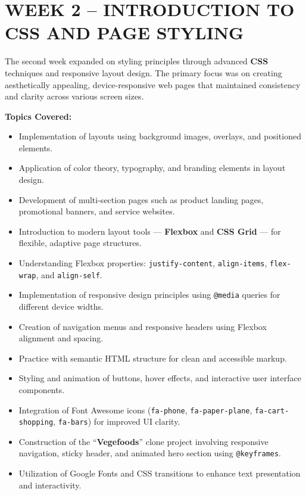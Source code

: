 \documentclass[a4paper,12pt,oneside]{report}
\numberwithin{equation}{chapter}
\numberwithin{figure}{chapter}
\numberwithin{table}{chapter}
\begin{document}
\vspace{5mm}
\noindent
\section{WEEK 2 – INTRODUCTION TO CSS AND PAGE STYLING}

The second week expanded on styling principles through advanced \textbf{CSS} techniques and responsive layout design. The primary focus was on creating aesthetically appealing, device-responsive web pages that maintained consistency and clarity across various screen sizes.

\textbf{Topics Covered:}
\begin{itemize}
    \item Implementation of layouts using background images, overlays, and positioned elements.
    \item Application of color theory, typography, and branding elements in layout design.
    \item Development of multi-section pages such as product landing pages, promotional banners, and service websites.
    \item Introduction to modern layout tools — \textbf{Flexbox} and \textbf{CSS Grid} — for flexible, adaptive page structures.
    \item Understanding Flexbox properties: \texttt{justify-content}, \texttt{align-items}, \texttt{flex-wrap}, and \texttt{align-self}.
    \item Implementation of responsive design principles using \texttt{@media} queries for different device widths.
    \item Creation of navigation menus and responsive headers using Flexbox alignment and spacing.
    \item Practice with semantic HTML structure for clean and accessible markup.
    \item Styling and animation of buttons, hover effects, and interactive user interface components.
    \item Integration of Font Awesome icons (\texttt{fa-phone}, \texttt{fa-paper-plane}, \texttt{fa-cart-shopping}, \texttt{fa-bars}) for improved UI clarity.
    \item Construction of the “\textbf{Vegefoods}” clone project involving responsive navigation, sticky header, and animated hero section using \texttt{@keyframes}.
    \item Utilization of Google Fonts and CSS transitions to enhance text presentation and interactivity.
\end{itemize}
\end{document}
